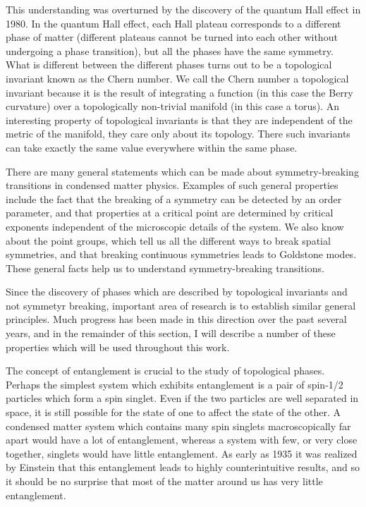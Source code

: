 This understanding was overturned by the discovery of the quantum Hall effect in 1980.\cite{klitzing} In the quantum Hall effect, each Hall plateau corresponds to a different phase of matter (different plateaus cannot be turned into each other without undergoing a phase transition), but all the phases have the same symmetry. What is different between the different phases turns out to be a topological invariant known as the Chern number. We call the Chern number a topological invariant because it is the result of integrating a function (in this case the Berry curvature) over a topologically non-trivial manifold (in this case a torus). An interesting property of topological invariants is that they are independent of the metric of the manifold, they care only about its topology. There such invariants can take exactly the same value everywhere within the same phase. 

There are many general statements which can be made about symmetry-breaking transitions in condensed matter physics. 
Examples of such general properties include the fact that the breaking of a symmetry can be detected by an order parameter, and that properties at a critical point are determined by  critical exponents independent of the microscopic details of the system. We also know about the point groups, which tell us all the different ways to break spatial symmetries, and that breaking continuous symmetries leads to Goldstone modes. These general facts help us to understand symmetry-breaking transitions.

Since the discovery of phases which are described by topological invariants and not symmetyr breaking, important area of research is to establish similar general principles. Much progress has been made in this direction over the past several years, and in the remainder of this section, I will describe a number of these properties which will be used throughout this work.

The concept of entanglement is crucial to the study of topological phases. Perhaps the simplest system which exhibits entanglement is a pair of spin-1/2 particles which form a spin singlet. Even if the two particles are well separated in space, it is still possible for the state of one to affect the state of the other. A condensed matter system which contains many spin singlets macroscopically far apart would have a lot of entanglement, whereas a system with few, or very close together, singlets would have little entanglement. As early as 1935 it was realized by Einstein\cite{Einstein} that this entanglement leads to highly counterintuitive results, and so it should be no surprise that most of the matter around us has very little entanglement.

